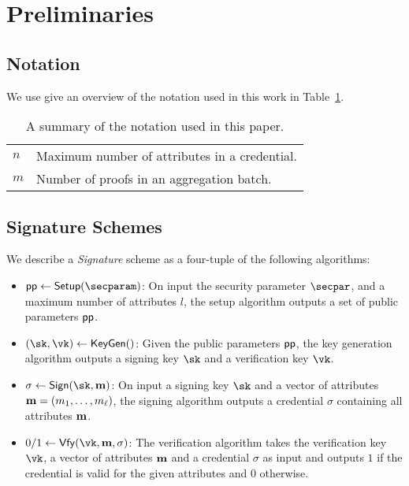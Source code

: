\section{Preliminaries} \label{sec:prelims}

\subsection{Notation} \label{sec:prelims:notation}
We use give an overview of the notation used in this work in Table~\ref{tab:notation}.

\begin{table}[!htb]
    \centering
    \footnotesize
    \begin{tabular}{ll}
        \toprule
        $n$ & Maximum number of attributes in a credential. \\
        $m$ & Number of proofs in an aggregation batch. \\
        \bottomrule
    \end{tabular}
    \caption{A summary of the notation used in this paper.}
    \label{tab:notation}
\end{table}

\subsection{Signature Schemes} \label{sec:prelims:sig}
We describe a \emph{Signature} scheme as a four-tuple of the following algorithms:
\begin{itemize}
    \item $\pubp\gets\Setup(\secparam)$: On input the security parameter $\secpar$, and a maximum number of attributes $l$, the setup algorithm outputs a set of public parameters $\mathsf{pp}$.
    \item $(\sk,\vk)\gets\KeyGen()$: Given the public parameters $\mathsf{pp}$, the key generation algorithm outputs a signing key $\sk$ and a verification key $\vk$.
    \item $\sigma\gets\Sign(\sk, \attr)$: On input a signing key $\sk$ and a vector of attributes $\mathbf{m}=(m_1,\ldots,m_\ell)$, the signing algorithm outputs a credential $\sigma$ containing all attributes $\mathbf{m}$.
    \item $0/1\gets \Vfy(\vk,\attr,\sigma)$: The verification algorithm takes the verification key $\vk$, a vector of attributes $\mathbf{m}$ and a credential $\sigma$ as input and outputs $1$ if the credential is valid for the given attributes and $0$ otherwise.
\end{itemize}

